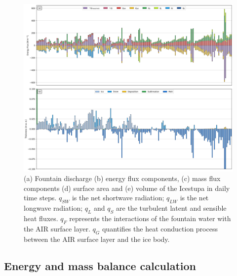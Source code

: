 \documentclass[utf8]{frontiersSCNS} %
\begin{document}
\begin{figure} \begin{center} \includegraphics[width=\linewidth]{Figures/Model_Output_Manual.jpg} \end{center}
\caption{(a) Fountain discharge (b) energy flux components, (c) mass flux components (d) surface area and (e) volume of
  the Icestupa in daily time steps.  $q_{SW}$ is the net shortwave radiation; $q_{LW}$ is the net longwave radiation;
  $q_{L}$ and $q_{S}$ are the turbulent latent and sensible heat fluxes. $q_{F}$ represents the interactions of the
  fountain water with the AIR surface layer.  $q_{G}$ quantifies the heat conduction process between the
  AIR surface layer and the ice body. } \label{fig:EB} \end{figure} \subsection{Energy and mass balance
calculation}

  
\end{document}
